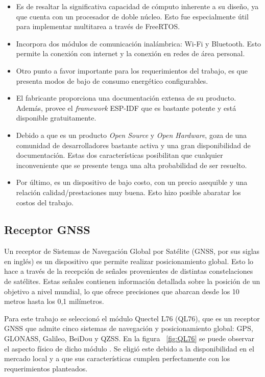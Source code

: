 \begin{itemize}
    \item Es de resaltar la significativa capacidad de cómputo inherente a su diseño, ya que cuenta con un procesador de doble núcleo. Esto fue especialmente útil para implementar multitarea a través de FreeRTOS.
    \item Incorpora dos módulos de comunicación inalámbrica: Wi-Fi y Bluetooth. Esto permite la conexión con internet y la conexión en redes de área personal. 
    \item Otro punto a favor importante para los requerimientos del trabajo, es que presenta modos de bajo de consumo energético configurables. 
    \item El fabricante proporciona una documentación extensa de su producto. Además, provee el \textit{framework} ESP-IDF que es bastante potente y está disponible gratuitamente.  
    \item Debido a que es un producto \textit{Open Source} y \textit{Open Hardware}, goza de una comunidad de desarrolladores bastante activa y una gran disponibilidad de documentación. Estas dos características posibilitan que cualquier inconveniente que se presente tenga una alta probabilidad de ser resuelto.  
    \item Por último, es un dispositivo de bajo costo, con un precio asequible y una relación calidad/prestaciones muy buena. Esto hizo posible abaratar los costos del trabajo. 
\end{itemize}


\subsection{Receptor GNSS}
\label{sec:QL76}

Un receptor de Sistemas de Navegación Global por Satélite (GNSS, por sus siglas en inglés) es un dispositivo que permite realizar posicionamiento global. Esto lo hace a través de la recepción de señales provenientes de distintas constelaciones de satélites. Estas señales contienen información detallada sobre la posición de un objetivo a nivel mundial, lo que ofrece precisiones que abarcan desde los 10 metros hasta los 0,1 milímetros.  

Para este trabajo se seleccionó el módulo Quectel L76 (QL76), que es un receptor GNSS que admite cinco sistemas de navegación y posicionamiento global: GPS, GLONASS, Galileo, BeiDou y QZSS. En la figura ~\ref{fig:QL76} se puede observar el aspecto físico de dicho módulo \citep{QL76}. Se eligió este debido a la disponibilidad en el mercado local y a que sus características cumplen perfectamente con los requerimientos planteados. 

